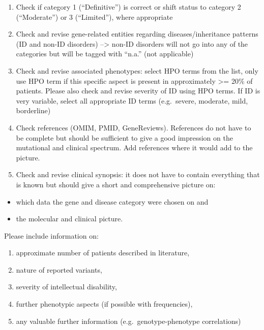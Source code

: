 \documentclass[
]{article}
\providecommand{\tightlist}{%
  \setlength{\itemsep}{0pt}\setlength{\parskip}{0pt}}
\begin{document}
\begin{enumerate}
\def\labelenumi{\arabic{enumi}.}
\tightlist
\item
  Check if category 1 (``Definitive'') is correct or shift status to category 2 (``Moderate'') or 3 (``Limited''), where appropriate
\item
  Check and revise gene-related entities regarding diseases/inheritance patterns (ID and non-ID disorders) --\textgreater{} non-ID disorders will not go into any of the categories but will be tagged with ``n.a.'' (not applicable)
\item
  Check and revise associated phenotypes: select HPO terms from the list, only use HPO term if this specific aspect is present in approximately \textgreater= 20\% of patients. Please also check and revise severity of ID using HPO terms. If ID is very variable, select all appropriate ID terms (e.g.~severe, moderate, mild, borderline)
\item
  Check references (OMIM, PMID, GeneReviews). References do not have to be complete but should be sufficient to give a good impression on the mutational and clinical spectrum. Add references where it would add to the picture.
\item
  Check and revise clinical synopsis: it does not have to contain everything that is known but should give a short and comprehensive picture on:
\end{enumerate}

\begin{itemize}
\tightlist
\item
  which data the gene and disease category were chosen on and
\item
  the molecular and clinical picture.
\end{itemize}

Please include information on:

\begin{enumerate}
\def\labelenumi{\alph{enumi})}
\tightlist
\item
  approximate number of patients described in literature,
\item
  nature of reported variants,
\item
  severity of intellectual disability,
\item
  further phenotypic aspects (if possible with frequencies),
\item
  any valuable further information (e.g.~genotype-phenotype correlations)
\end{enumerate}
\end{document}
